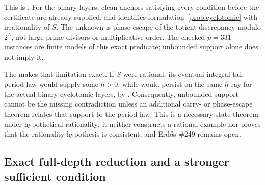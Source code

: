 \documentclass[11pt]{article}
\newcommand{\Stot}{S}
\begin{document}
\noindent This is
.
For the binary layers, clean anchors satisfying every condition before the
certificate are already supplied, and
identifies formulation~\ref{prob:cyclotomic} with irrationality of $\Stot$.
The unknown is phase escape of the totient discrepancy modulo $2^L$, not
large prime divisors or multiplicative order.  The checked $p=331$ instances
are finite models of this exact predicate; unbounded support alone does not
imply it.

The
makes that limitation exact.  If $\Stot$ were rational, its eventual integral
tail-period law would supply some $h>0$, while
would persist on the same $h$-ray for the actual binary cyclotomic layers, by
.
Consequently, unbounded support cannot be the missing contradiction unless an
additional carry- or phase-escape theorem relates that support to the period
law.  This is a necessary-state theorem under hypothetical rationality: it
neither constructs a rational example nor proves that the rationality
hypothesis is consistent, and Erd\H{o}s \#249 remains open.

\subsection{Exact full-depth reduction and a stronger sufficient condition}
\end{document}
